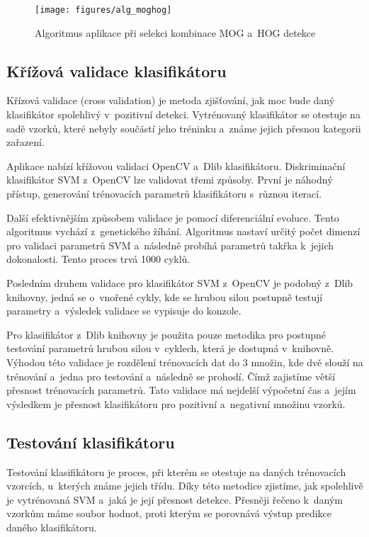 \begin{figure}[H]
\centering
\texttt{[image: figures/alg\_moghog]}
\caption{Algoritmus aplikace při selekci kombinace MOG a~HOG detekce}
\label{mog_algorithm}
\end{figure}

\subsection{Křížová validace klasifikátoru}
Křízová validace (cross validation) je metoda zjišťování, jak moc bude daný klasifikátor spolehlivý v~pozitivní detekci. Vytrénovaný klasifikátor se otestuje na sadě vzorků, které nebyly součástí jeho tréninku a~známe jejich přesnou kategorii zařazení.

Aplikace nabízí křížovou validaci OpenCV a~Dlib klasifikátoru. Diskriminační klasifikátor SVM z~OpenCV lze validovat třemi způsoby. První je náhodný přístup, generování trénovacích parametrů klasifikátoru s~různou iterací.

Další efektivnějším způsobem validace je pomocí diferenciální evoluce. Tento algoritmus vychází z~genetického žíhání. Algoritmus nastaví určitý počet dimenzí pro validaci parametrů SVM a~následně probíhá  parametrů takřka k~jejich dokonalosti. Tento proces trvá 1000 cyklů.

Posledním druhem validace pro klasifikátor SVM z~OpenCV je podobný z~Dlib knihovny, jedná se o~vnořené cykly, kde se hrubou silou postupně testují parametry a~výsledek validace se vypisuje do konzole. 

Pro klasifikátor z~Dlib knihovny je použita pouze metodika pro postupné testování parametrů hrubou silou v~cyklech, která je dostupná v~knihovně. Výhodou této validace je rozdělení trénovacích dat do 3 množin, kde dvě slouží na trénování a~jedna pro testování a~následně se prohodí. Čímž zajistíme větší přesnost trénovacích parametrů. Tato validace má nejdelší výpočetní čas a~jejím výsledkem je přesnost klasifikátoru pro pozitivní a~negativní množinu vzorků.

\subsection{Testování klasifikátoru}
Testování klasifikátoru je proces, při kterém se otestuje na daných trénovacích vzorcích, u~kterých známe jejich třídu. Díky této metodice zjistíme, jak spolehlivě je vytrénovaná SVM a~jaká je její přesnost detekce. Přesněji řečeno k~daným vzorkům máme soubor  hodnot, proti kterým se porovnává výstup predikce daného klasifikátoru. 

